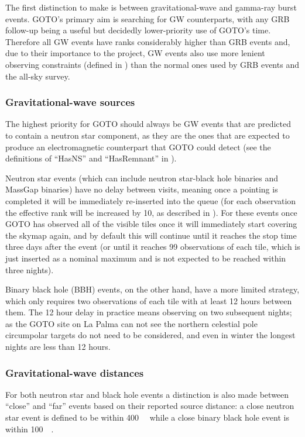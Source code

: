 \begin{colsection}
The first distinction to make is between gravitational-wave and gamma-ray burst events. GOTO's primary aim is searching for GW counterparts, with any GRB follow-up being a useful but decidedly lower-priority use of GOTO's time. Therefore all GW events have ranks considerably higher than GRB events and, due to their importance to the project, GW events also use more lenient observing constraints (defined in ) than the normal ones used by GRB events and the all-sky survey.

\subsubsection{Gravitational-wave sources}

The highest priority for GOTO should always be GW events that are predicted to contain a neutron star component, as they are the ones that are expected to produce an electromagnetic counterpart that GOTO could detect (see the definitions of ``HasNS'' and ``HasRemnant'' in ).

Neutron star events (which can include neutron star-black hole binaries and MassGap binaries) have no delay between visits, meaning once a pointing is completed it will be immediately re-inserted into the queue (for each observation the effective rank will be increased by 10, as described in ). For these events once GOTO has observed all of the visible tiles once it will immediately start covering the skymap again, and by default this will continue until it reaches the stop time three days after the event (or until it reaches 99 observations of each tile, which is just inserted as a nominal maximum and is not expected to be reached within three nights).

Binary black hole (BBH) events, on the other hand, have a more limited  strategy, which only requires two observations of each tile with at least 12 hours between them. The 12 hour delay in practice means observing on two subsequent nights; as the GOTO site on La Palma can not see the northern celestial pole circumpolar targets do not need to be considered, and even in winter the longest nights are less than 12 hours.

\subsubsection{Gravitational-wave distances}

For both neutron star and black hole events a distinction is also made between ``close'' and ``far'' events based on their reported source distance: a close neutron star event is defined to be within \SI{400}{\mega\parsec} while a close binary black hole event is within \SI{100}{\mega\parsec}.


\end{colsection}

